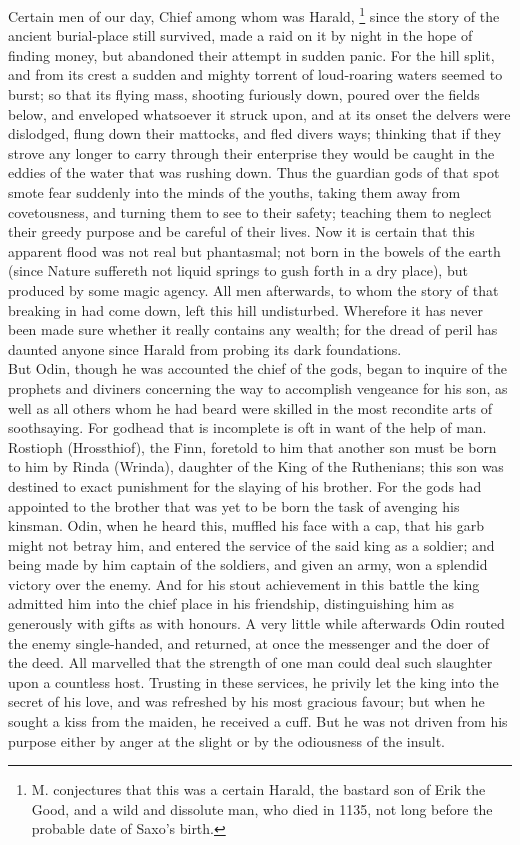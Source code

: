 \documentclass[10pt,a4paper]{report}
\begin{document}
Certain men of our day, Chief among whom was Harald, \footnote{M. conjectures that this was a certain Harald, the bastard son of Erik the Good, and a wild and dissolute man, who died in 1135, not long before the probable date of Saxo's birth.} since the story of the ancient burial-place still survived, made a raid on it by night in the hope of finding money, but abandoned their attempt in sudden panic. For the hill split, and from its crest a sudden and mighty torrent of loud-roaring waters seemed to burst; so that its flying mass, shooting furiously down, poured over the fields below, and enveloped whatsoever it struck upon, and at its onset the delvers were dislodged, flung down their mattocks, and fled divers ways; thinking that if they strove any longer to carry through their enterprise they would be caught in the eddies of the water that was rushing down. Thus the guardian gods of that spot smote fear suddenly into the minds of the youths, taking them away from covetousness, and turning them to see to their safety; teaching them to neglect their greedy purpose and be careful of their lives. Now it is certain that this apparent flood was not real but phantasmal; not born in the bowels of the earth (since Nature suffereth not liquid springs to gush forth in a dry place), but produced by some magic agency. All men afterwards, to whom the story of that breaking in had come down, left this hill undisturbed. Wherefore it has never been made sure whether it really contains any wealth; for the dread of peril has daunted anyone since Harald from probing its dark foundations.\\

But Odin, though he was accounted the chief of the gods, began to inquire of the prophets and diviners concerning the way to accomplish vengeance for his son, as well as all others whom he had beard were skilled in the most recondite arts of soothsaying. For godhead that is incomplete is oft in want of the help of man. Rostioph (Hrossthiof), the Finn, foretold to him that another son must be born to him by Rinda (Wrinda), daughter of the King of the Ruthenians; this son was destined to exact punishment for the slaying of his brother. For the gods had appointed to the brother that was yet to be born the task of avenging his kinsman. Odin, when he heard this, muffled his face with a cap, that his garb might not betray him, and entered the service of the said king as a soldier; and being made by him captain of the soldiers, and given an army, won a splendid victory over the enemy. And for his stout achievement in this battle the king admitted him into the chief place in his friendship, distinguishing him as generously with gifts as with honours. A very little while afterwards Odin routed the enemy single-handed, and returned, at once the messenger and the doer of the deed. All marvelled that the strength of one man could deal such slaughter upon a countless host. Trusting in these services, he privily let the king into the secret of his love, and was refreshed by his most gracious favour; but when he sought a kiss from the maiden, he received a cuff. But he was not driven from his purpose either by anger at the slight or by the odiousness of the insult.\\
\end{document}
